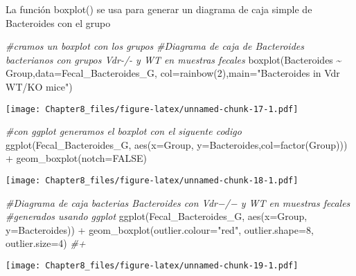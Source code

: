 \documentclass[
]{article}
\newenvironment{Shaded}{\begin{snugshade}}{\end{snugshade}}
\newcommand{\AttributeTok}[1]{\textcolor[rgb]{0.77,0.63,0.00}{#1}}
\newcommand{\CommentTok}[1]{\textcolor[rgb]{0.56,0.35,0.01}{\textit{#1}}}
\newcommand{\ConstantTok}[1]{\textcolor[rgb]{0.00,0.00,0.00}{#1}}
\newcommand{\DecValTok}[1]{\textcolor[rgb]{0.00,0.00,0.81}{#1}}
\newcommand{\FunctionTok}[1]{\textcolor[rgb]{0.00,0.00,0.00}{#1}}
\newcommand{\NormalTok}[1]{#1}
\newcommand{\SpecialCharTok}[1]{\textcolor[rgb]{0.00,0.00,0.00}{#1}}
\newcommand{\StringTok}[1]{\textcolor[rgb]{0.31,0.60,0.02}{#1}}
\begin{document}
La función boxplot() se usa para generar un diagrama de caja simple de
Bacteroides con el grupo

\begin{Shaded}
\begin{Highlighting}[]
\CommentTok{\#cramos un boxplot con los  grupos }
\CommentTok{\#Diagrama de caja de Bacteroides bacterianos con grupos Vdr{-}/{-} y WT en muestras fecales}
\FunctionTok{boxplot}\NormalTok{(Bacteroides }\SpecialCharTok{\textasciitilde{}}\NormalTok{ Group,}\AttributeTok{data=}\NormalTok{Fecal\_Bacteroides\_G, }\AttributeTok{col=}\FunctionTok{rainbow}\NormalTok{(}\DecValTok{2}\NormalTok{),}\AttributeTok{main=}\StringTok{"Bacteroides in Vdr WT/KO mice"}\NormalTok{)}
\end{Highlighting}
\end{Shaded}

\texttt{[image: Chapter8\_files/figure-latex/unnamed-chunk-17-1.pdf]}

\begin{Shaded}
\begin{Highlighting}[]
\CommentTok{\#con ggplot generamos el boxplot con el siguente codigo}
\FunctionTok{ggplot}\NormalTok{(Fecal\_Bacteroides\_G, }\FunctionTok{aes}\NormalTok{(}\AttributeTok{x=}\NormalTok{Group, }\AttributeTok{y=}\NormalTok{Bacteroides,}\AttributeTok{col=}\FunctionTok{factor}\NormalTok{(Group))) }\SpecialCharTok{+} 
  \FunctionTok{geom\_boxplot}\NormalTok{(}\AttributeTok{notch=}\ConstantTok{FALSE}\NormalTok{)}
\end{Highlighting}
\end{Shaded}

\texttt{[image: Chapter8\_files/figure-latex/unnamed-chunk-18-1.pdf]}

\begin{Shaded}
\begin{Highlighting}[]
\CommentTok{\#Diagrama de caja  bacterias Bacteroides con Vdr−/− y WT en muestras fecales}
\CommentTok{\#generados usando ggplot}
\FunctionTok{ggplot}\NormalTok{(Fecal\_Bacteroides\_G, }\FunctionTok{aes}\NormalTok{(}\AttributeTok{x=}\NormalTok{Group, }\AttributeTok{y=}\NormalTok{Bacteroides)) }\SpecialCharTok{+} 
  \FunctionTok{geom\_boxplot}\NormalTok{(}\AttributeTok{outlier.colour=}\StringTok{"red"}\NormalTok{, }\AttributeTok{outlier.shape=}\DecValTok{8}\NormalTok{, }\AttributeTok{outlier.size=}\DecValTok{4}\NormalTok{) }\CommentTok{\#+ }
\end{Highlighting}
\end{Shaded}

\texttt{[image: Chapter8\_files/figure-latex/unnamed-chunk-19-1.pdf]}
\end{document}
